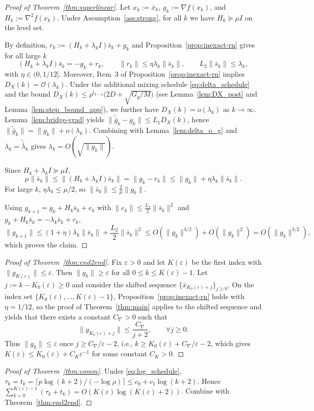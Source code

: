 \documentclass[10pt,twocolumn,letterpaper]{article}
\def\cO{O}%
\theoremstyle{compact}
\theoremstyle{compactremark}
\newcommand{\cO}{\mathcal{O}}
\begin{document}
\begin{proof}[Proof of Theorem~\ref{thm:superlinear}]
Let $x_k:=\bar x_k$, $g_k:=\nabla f(x_k)$, and $H_k:=\nabla^2 f(x_k)$.
Under Assumption~\ref{ass:strong}, for all $k$ we have $H_k\succeq \mu I$ on the level set.

By definition, $r_k:=(H_k+\lambda_k I)\bar s_k+g_k$ and Proposition~\ref{prop:inexact-rn} gives for all large $k$
\[
(H_k+\lambda_k I)\bar s_k=-g_k+r_k,\qquad \|r_k\|\le \eta\lambda_k\|\bar s_k\|,\qquad L_2\|\bar s_k\|\le \lambda_k,
\]
with $\eta\in(0,1/12]$. Moreover, Item~3 of Proposition~\ref{prop:inexact-rn} implies $D_X(k)=\mathcal O(\lambda_k)$.
Under the additional mixing schedule \eqref{eq:delta_schedule} and the bound
$D_X(k)\le \rho^{t_{k-1}}\big(2D+\sqrt{G_g/M}\big)$ (see Lemma~\ref{lem:DX_post} and Lemma~\ref{lem:step_bound_app}),
we further have $D_X(k)=o(\lambda_k)$ as $k\to\infty$.
Lemma~\ref{lem:bridge-grad} yields
$\|\tilde{\bar g}_k-g_k\|\le L_1D_X(k)$, hence $\|\tilde{\bar g}_k\|=\|g_k\|+o(\lambda_k)$.
Combining with Lemma~\ref{lem:delta_o_g} and $\lambda_k=\tilde{\bar\lambda}_k$ gives $\lambda_k=\cO(\sqrt{\|g_k\|})$.

Since $H_k+\lambda_k I\succeq \mu I$,
\[
\mu\|\bar s_k\|\le \|(H_k+\lambda_k I)\bar s_k\|=\|g_k-r_k\|\le \|g_k\|+\eta\lambda_k\|\bar s_k\|.
\]
For large $k$, $\eta\lambda_k\le \mu/2$, so $\|\bar s_k\|\le \frac{2}{\mu}\|g_k\|$.

Using $g_{k+1}=g_k+H_k\bar s_k+e_k$ with $\|e_k\|\le \frac{L_2}{2}\|\bar s_k\|^2$ and $g_k+H_k\bar s_k=-\lambda_k\bar s_k+r_k$,
\[
\|g_{k+1}\|\le (1+\eta)\lambda_k\|\bar s_k\|+\frac{L_2}{2}\|\bar s_k\|^2
\le \cO(\|g_k\|^{3/2})+\cO(\|g_k\|^2)=\cO(\|g_k\|^{3/2}),
\]
which proves the claim.
\end{proof}



\begin{proof}[Proof of Theorem~\ref{thm:end2end}]
Fix $\varepsilon>0$ and let $K(\varepsilon)$ be the first index with $\|g_{K(\varepsilon)}\|\le \varepsilon$.
Then $\|g_k\|\ge \varepsilon$ for all $0\le k\le K(\varepsilon)-1$.
Let $j:=k-K_0(\varepsilon)\ge 0$ and consider the shifted sequence $\{\bar x_{K_0(\varepsilon)+j}\}_{j\ge 0}$.
On the index set $\{K_0(\varepsilon),\dots,K(\varepsilon)-1\}$, Proposition~\ref{prop:inexact-rn} holds with $\eta=1/12$,
so the proof of Theorem~\ref{thm:main} applies to the shifted sequence and yields that there exists a constant
$C_{\nabla}>0$ such that
\[
\|g_{K_0(\varepsilon)+j}\|\le \frac{C_{\nabla}}{j+2},\qquad \forall j\ge 0.
\]
Thus $\|g_k\|\le \varepsilon$ once $j\ge C_{\nabla}/\varepsilon-2$, i.e., $k\ge K_0(\varepsilon)+C_{\nabla}/\varepsilon-2$,
which gives $K(\varepsilon)\le K_0(\varepsilon)+C_K\varepsilon^{-1}$ for some constant $C_K>0$.
\end{proof}

\begin{proof}[Proof of Theorem~\ref{thm:comm}]
Under \eqref{eq:log_schedule}, $\tau_k=t_k=\lceil p\log(k+2)/(-\log\rho)\rceil\le c_0+c_1\log(k+2)$.
Hence $\sum_{k=0}^{K(\varepsilon)-1}(\tau_k+t_k)=\cO(K(\varepsilon)\log(K(\varepsilon)+2))$.
Combine with Theorem~\ref{thm:end2end}.
\end{proof}
\end{document}
